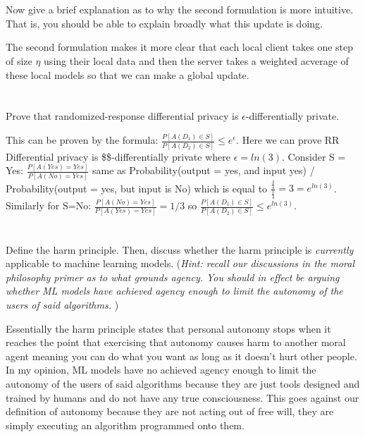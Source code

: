 \documentclass[
]{article}
\begin{document}
\hypertarget{section-2}{%
\section{}\label{section-2}}

Now give a brief explanation as to why the second formulation is more
intuitive. That is, you should be able to explain broadly what this
update is doing.

The second formulation makes it more clear that each local client takes
one step of size \(\eta\) using their local data and then the server
takes a weighted acverage of these local models so that we can make a
global update.

\hypertarget{section-3}{%
\section{}\label{section-3}}

Prove that randomized-response differential privacy is
\(\epsilon\)-differentially private.

This can be proven by the formula:
\(\frac{P[A(D_1) \in S]}{P[A(D_2) \in S]} \leq e^\epsilon\). Here we can
prove RR Differential privacy is \$\epsilon \$-differentially private
where \(\epsilon = ln(3)\). Consider S = Yes:
\(\frac{P[A(Yes) = Yes]}{P[A(No) = Yes]}\) same as Probability(output =
yes, and input yes) / Probability(output = yes, but input is No) which
is equal to \(\frac{\frac{3}{4}}{\frac{1}{4}} = 3 = e^{ln(3)}\).
Similarly for S=No: \(\frac{P[A(No) = Yes]}{P[A(Yes) = Yes]} = 1/3\) so
\(\frac{P[A(D_1) \in S]}{P[A(D_2) \in S]} \leq e^{ln(3)}\).

\hypertarget{section-4}{%
\section{}\label{section-4}}

Define the harm principle. Then, discuss whether the harm principle is
\emph{currently} applicable to machine learning models. (\emph{Hint:
recall our discussions in the moral philosophy primer as to what grounds
agency. You should in effect be arguing whether ML models have achieved
agency enough to limit the autonomy of the users of said algorithms.} )

Essentially the harm principle states that personal autonomy stops when
it reaches the point that exercising that autonomy causes harm to
another moral agent meaning you can do what you want as long as it
doesn't hurt other people. In my opinion, ML models have no achieved
agency enough to limit the autonomy of the users of said algorithms
because they are just tools designed and trained by humans and do not
have any true consciousness. This goes against our definition of
autonomy because they are not acting out of free will, they are simply
executing an algorithm programmed onto them.
\end{document}
